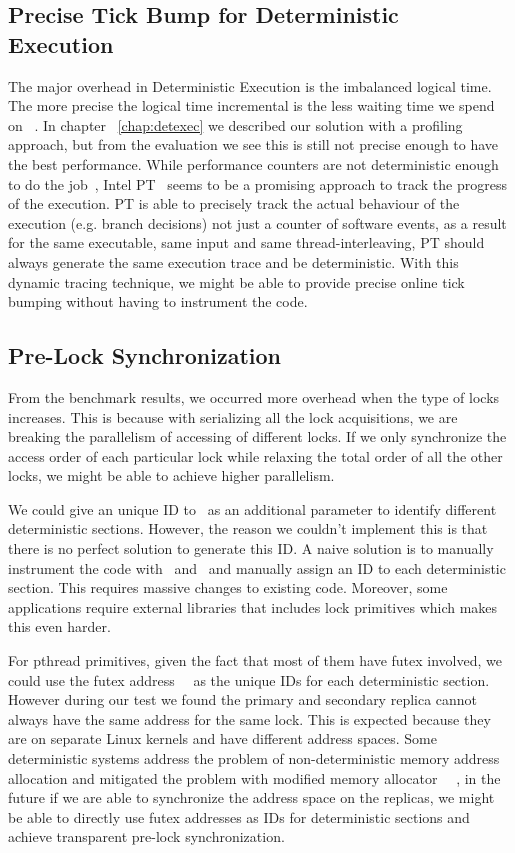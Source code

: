 \subsection{Precise Tick Bump for Deterministic Execution}
The major overhead in Deterministic Execution is the imbalanced logical time. The more precise the logical time incremental is the less waiting time we spend on \detstart\ . In chapter ~\ref{chap:detexec} we described our solution with a profiling approach, but from the evaluation we see this is still not precise enough to have the best performance. While performance counters are not deterministic enough to do the job~\cite{weaver2008can}, Intel PT~\cite{intelpt} seems to be a promising approach to track the progress of the execution. PT is able to precisely track the actual behaviour of the execution (e.g. branch decisions) not just a counter of software events, as a result for the same executable, same input and same thread-interleaving, PT should always generate the same execution trace and be deterministic. With this dynamic tracing technique, we might be able to provide precise online tick bumping without having to instrument the code.
\subsection{Pre-Lock Synchronization}
From the benchmark results, we occurred more overhead when the type of locks increases. This is because with serializing all the lock acquisitions, we are breaking the parallelism of accessing of different locks. If we only synchronize the access order of each particular lock while relaxing the total order of all the other locks, we might be able to achieve higher parallelism.

We could give an unique ID to \detstart\ as an additional parameter to identify different deterministic sections. However, the reason we couldn't implement this is that there is no perfect solution to generate this ID. A naive solution is to manually instrument the code with \detstart\ and \detend\, and manually assign an ID to each deterministic section. This requires massive changes to existing code. Moreover, some applications require external libraries that includes lock primitives which makes this even harder.

For pthread primitives, given the fact that most of them have futex involved, we could use the futex address~\cite{drepper2005futexes}~\cite{franke2002fuss} as the unique IDs for each deterministic section. However during our test we found the primary and secondary replica cannot always have the same address for the same lock. This is expected because they are on separate Linux kernels and have different address spaces. Some deterministic systems address the problem of non-deterministic memory address allocation and mitigated the problem with modified memory allocator ~\cite{bergan2010deterministic}~\cite{liu2011dthreads}, in the future if we are able to synchronize the address space on the replicas, we might be able to directly use futex addresses as IDs for deterministic sections and achieve transparent pre-lock synchronization. 

